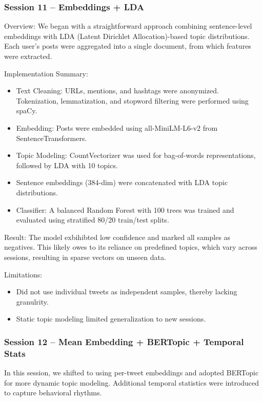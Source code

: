 \documentclass[conference]{IEEEtran}
\begin{document}
\subsubsection{Session 11 – Embeddings + LDA}
Overview:
We began with a straightforward approach combining sentence-level embeddings with LDA (Latent Dirichlet Allocation)-based topic distributions. 
Each user’s posts were aggregated into a single document, from which features were extracted.

Implementation Summary:
\begin{itemize}
    \item Text Cleaning: URLs, mentions, and hashtags were anonymized. Tokenization, lemmatization, and stopword filtering were performed using spaCy.
    
    \item Embedding: Posts were embedded using all-MiniLM-L6-v2 from SentenceTransformers.
    
    \item Topic Modeling: CountVectorizer was used for bag-of-words representations, followed by LDA with 10 topics.
    
    \item Sentence embeddings (384-dim) were concatenated with LDA topic distributions.
    
    \item Classifier: A balanced Random Forest with 100 trees was trained and evaluated using stratified 80/20 train/test splits.
\end{itemize}

Result:
The model exbihibted low confidence and marked all samples as negatives. This likely owes
to its reliance on predefined topics, which vary across sessions, resulting in sparse vectors 
on unseen data.

Limitations:
\begin{itemize}
    \item Did not use individual tweets as independent samples, thereby lacking granulrity.
    
    \item Static topic modeling limited generalization to new sessions.
\end{itemize}

\subsubsection{Session 12 – Mean Embedding + BERTopic + Temporal Stats}
In this session, we shifted to using per-tweet embeddings and adopted BERTopic for more dynamic topic modeling. Additional temporal statistics were introduced to capture behavioral rhythms.
\end{document}
